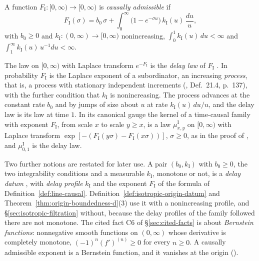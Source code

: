 \begin{definition}\label{def:line-causal}
A function $F_{\mathrm I} : [0,\infty) \to [0,\infty)$ is \emph{causally admissible} if
\[
  F_{\mathrm I}(\sigma) = b_0\,\sigma
   + \int_0^\infty \bigl(1 - e^{-\sigma u}\bigr)\,k_{\mathrm I}(u)\,\frac{du}{u},
\]
with $b_0 \ge 0$ and $k_{\mathrm I} : (0,\infty) \to [0,\infty)$ nonincreasing,
$\int_0^1 k_{\mathrm I}(u)\,du < \infty$ and $\int_1^\infty k_{\mathrm I}(u)\,u^{-1}du < \infty$.
\end{definition}

The law on $[0,\infty)$ with Laplace transform $e^{-F_{\mathrm I}}$ is the \emph{delay law} of
$F_{\mathrm I}$ . In probability $F_{\mathrm I}$ is the Laplace exponent of a
subordinator, an increasing \emph{\Levy{} process}, that is, a process with stationary
independent increments (, Def.~21.4, p.~137), with the
further condition that $k_{\mathrm I}$ is nonincreasing. The process advances at the constant
rate $b_0$ and by jumps of size about $u$ at rate $k_{\mathrm I}(u)\,du/u$, and the delay law is
its law at time $1$. In its canonical gauge the kernel of a
time-causal family with exponent $F_{\mathrm I}$, from scale $x$ to scale $y \ge x$, is a law
$\mu^{\mathrm I}_{x,y}$ on $[0,\infty)$ with Laplace transform
$\exp[-(F_{\mathrm I}(y\sigma) - F_{\mathrm I}(x\sigma))]$, $\sigma \ge 0$, as in the proof of
, and $\mu^{\mathrm I}_{0,1}$ is the delay law.

Two further notions are restated for later use. A pair $(b_0, k_{\mathrm I})$ with $b_0 \ge 0$,
the two integrability conditions and a measurable $k_{\mathrm I}$, monotone or not, is a
\emph{delay datum} , with \emph{delay profile} $k_{\mathrm I}$ and the
exponent $F_{\mathrm I}$ of the formula of Definition~\ref{def:line-causal}.
Definition~\ref{def:isotropic-origin-datum} and Theorem~\ref{thm:origin-boundedness-d}(3) use it
with a nonincreasing profile, and \S\ref{sec:isotropic-filtration} without, because the delay
profiles of the family followed there are not monotone. The cited fact C6 of \S\ref{sec:cited-facts} is
about \emph{Bernstein functions}: nonnegative smooth functions on $(0,\infty)$ whose derivative
is completely monotone, $(-1)^n (f')^{(n)} \ge 0$ for every $n \ge 0$. A causally admissible
exponent is a Bernstein function, and it vanishes at the origin ().

